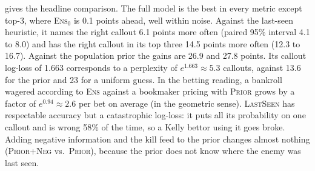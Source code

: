 \documentclass[11pt]{article}
\newcommand{\model}[1]{\textsc{#1}}
\newcommand{\1}{\mathbb{1}}
\begin{document}
 gives the headline comparison. The full model is the best in every metric except top-3, where \model{Ens$_0$} is 0.1 points ahead, well within noise. Against the last-seen heuristic, it names the right callout 6.1 points more often (paired 95\% interval 4.1 to 8.0) and has the right callout in its top three 14.5 points more often (12.3 to 16.7). Against the population prior the gains are 26.9 and 27.8 points. Its callout log-loss of 1.663 corresponds to a perplexity of $e^{1.663} \approx 5.3$ callouts, against 13.6 for the prior and 23 for a uniform guess. In the betting reading, a bankroll wagered according to \model{Ens} against a bookmaker pricing with \model{Prior} grows by a factor of $e^{0.94} \approx 2.6$ per bet on average (in the geometric sense). \model{LastSeen} has respectable accuracy but a catastrophic log-loss: it puts all its probability on one callout and is wrong 58\% of the time, so a Kelly bettor using it goes broke. Adding negative information and the kill feed to the prior changes almost nothing (\model{Prior+Neg} vs.\ \model{Prior}), because the prior does not know where the enemy was last seen.
\end{document}
